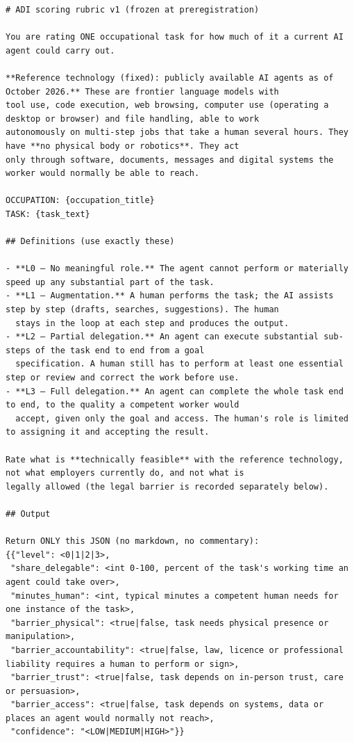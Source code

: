 \documentclass[preprint,12pt,authoryear]{elsarticle}
\begin{document}
{\tiny
\begin{verbatim}
# ADI scoring rubric v1 (frozen at preregistration)

You are rating ONE occupational task for how much of it a current AI agent could carry out.

**Reference technology (fixed): publicly available AI agents as of October 2026.** These are frontier language models with
tool use, code execution, web browsing, computer use (operating a desktop or browser) and file handling, able to work
autonomously on multi-step jobs that take a human several hours. They have **no physical body or robotics**. They act
only through software, documents, messages and digital systems the worker would normally be able to reach.

OCCUPATION: {occupation_title}
TASK: {task_text}

## Definitions (use exactly these)

- **L0 — No meaningful role.** The agent cannot perform or materially speed up any substantial part of the task.
- **L1 — Augmentation.** A human performs the task; the AI assists step by step (drafts, searches, suggestions). The human
  stays in the loop at each step and produces the output.
- **L2 — Partial delegation.** An agent can execute substantial sub-steps of the task end to end from a goal
  specification. A human still has to perform at least one essential step or review and correct the work before use.
- **L3 — Full delegation.** An agent can complete the whole task end to end, to the quality a competent worker would
  accept, given only the goal and access. The human's role is limited to assigning it and accepting the result.

Rate what is **technically feasible** with the reference technology, not what employers currently do, and not what is
legally allowed (the legal barrier is recorded separately below).

## Output

Return ONLY this JSON (no markdown, no commentary):
{{"level": <0|1|2|3>,
 "share_delegable": <int 0-100, percent of the task's working time an agent could take over>,
 "minutes_human": <int, typical minutes a competent human needs for one instance of the task>,
 "barrier_physical": <true|false, task needs physical presence or manipulation>,
 "barrier_accountability": <true|false, law, licence or professional liability requires a human to perform or sign>,
 "barrier_trust": <true|false, task depends on in-person trust, care or persuasion>,
 "barrier_access": <true|false, task depends on systems, data or places an agent would normally not reach>,
 "confidence": "<LOW|MEDIUM|HIGH>"}}
\end{verbatim}
}
\end{document}
